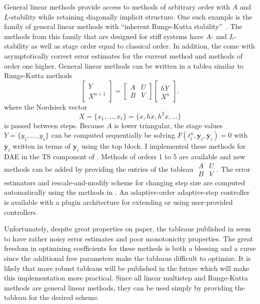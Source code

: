 General linear methods provide access to methods of arbitrary order with $A$ and $L$-stability while retaining diagonally implicit structure.
One such example is the family of general linear methods with ``inherent Runge-Kutta stability''~\citep{wright2002general,butcher2006general}.
The methods from this family that are designed for stiff systems have $A$- and $L$-stability as well as stage order equal to classical order.
In addition, the come with asymptotically correct error estimates for the current method and methods of order one higher.
General linear methods can be written in a tablea similar to Runge-Kutta methods
\begin{equation*}
  \begin{bmatrix} Y \\ X^{n+1} \end{bmatrix}
  = \begin{bmatrix} A & U \\ B & V \end{bmatrix}
  \begin{bmatrix} h \dot{Y} \\ X^{n} \end{bmatrix} .
\end{equation*}
where the Nordsieck vector
\begin{equation*}
  X = \{x_1,\dotsc,x_r\} = \{x, h \dot{x}, h^2 \ddot{x}, \dotsc \}
\end{equation*}
is passed between steps.
Because $A$ is lower triangular, the stage values $Y = \{ y_1,\dotsc,y_s \}$ can be computed sequentially be solving $F(t^n_i,\bm{y}_i,\dot{\bm{y}_i}) = 0$ with $\dot{\bm{y}_i}$ written in terms of $\bm{y}_i$ using the top block.
I implemented these methods for DAE in the TS component of {\PETSc}.
Methods of orders 1 to 5 are available and new methods can be added by providing the entries of the tableau $\begin{smallmatrix}A & U \\ B & V\end{smallmatrix}$.
The error estimators and rescale-and-modify scheme for changing step size are computed automatically using the methods in \citet{butcher2007error}.
An adaptive-order adaptive-step controller is available with a plugin architecture for extending or using user-provided controllers.

Unfortunately, despite great properties on paper, the tableaus published in \citet{butcher2006error,podhaisky2006atlas} seem to have rather noisy error estimates and poor monotonicity properties.
The great freedom in optimizing coefficients for these metheds is both a blessing and a curse since the additional free parameters make the tableaus difficult to optimize.
It is likely that more robust tableaus will be published in the future which will make this implementation more practical.
Since all linear multistep and Runge-Kutta methods are general linear methods, they can be used simply by providing the tableau for the desired scheme.

